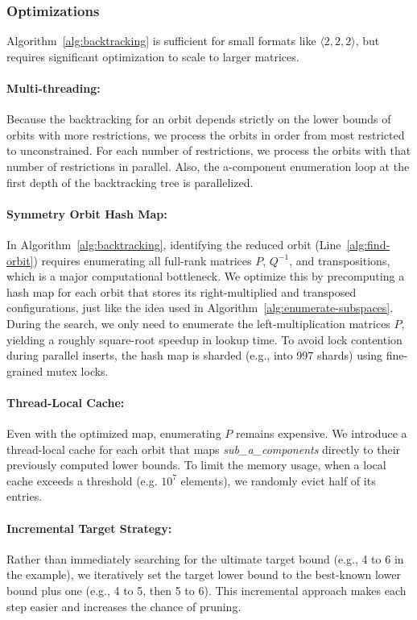 \documentclass[11pt]{article}
\begin{document}
\subsubsection{Optimizations}
Algorithm~\ref{alg:backtracking} is sufficient for small formats like $\langle 2,2,2\rangle$, but requires significant optimization to scale to larger matrices.

\paragraph{Multi-threading:} Because the backtracking for an orbit depends strictly on the lower bounds of orbits with more restrictions, we process the orbits in order from most restricted to unconstrained. For each number of restrictions, we process the orbits with that number of restrictions in parallel. Also, the a-component enumeration loop at the first depth of the backtracking tree is parallelized.

\paragraph{Symmetry Orbit Hash Map:} In Algorithm~\ref{alg:backtracking}, identifying the reduced orbit (Line~\ref{alg:find-orbit}) requires enumerating all full-rank matrices $P$, $Q^{-1}$, and transpositions, which is a major computational bottleneck. We optimize this by precomputing a hash map for each orbit that stores its right-multiplied and transposed configurations, just like the idea used in Algorithm~\ref{alg:enumerate-subspaces}. During the search, we only need to enumerate the left-multiplication matrices $P$, yielding a roughly square-root speedup in lookup time. To avoid lock contention during parallel inserts, the hash map is sharded (e.g., into 997 shards) using fine-grained mutex locks.

\paragraph{Thread-Local Cache:} Even with the optimized map, enumerating $P$ remains expensive. We introduce a thread-local cache for each orbit that maps \textit{sub\_a\_components} directly to their previously computed lower bounds. To limit the memory usage, when a local cache exceeds a threshold (e.g. $10^7$ elements), we randomly evict half of its entries.

\paragraph{Incremental Target Strategy:} Rather than immediately searching for the ultimate target bound (e.g., 4 to 6 in the example), we iteratively set the target lower bound to the best-known lower bound plus one (e.g., 4 to 5, then 5 to 6). This incremental approach makes each step easier and increases the chance of pruning.
\end{document}
